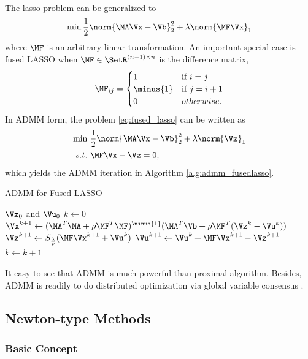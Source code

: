 \documentclass[
10pt, %
a4paper, %
oneside, %
headinclude,footinclude, %
BCOR5mm, %
]{scrartcl}
\begin{document}
\paragraph{}
The lasso problem can be generalized to
\begin{equation} \label{eq:fused_lasso}
	\min \frac{1}{2}\norm{\MA \Vx - \Vb}_2^2 + \lambda \norm{\MF \Vx}_1
\end{equation}
where $\MF$ is an arbitrary linear transformation. An important special case is 
fused LASSO when $\MF \in \SetR^{(n-1) \times n}$ is the difference matrix,
\begin{equation*}
\MF_{ij} =  
	\begin{cases} 1 &\mbox{if }  i = j \\
	\minus{1} & \mbox{if } j = i+1 \\
	0 & otherwise.\end{cases} 
\end{equation*}
In ADMM form, the problem \eqref{eq:fused_lasso} can be written as
\begin{align}
	\min~& \frac{1}{2}\norm{\MA \Vx - \Vb}_2^2 + \lambda \norm{\Vz}_1
	\nonumber \\
	s.t.~& \MF\Vx - \Vz = 0, \nonumber
\end{align}
which yields the ADMM iteration in Algorithm \ref{alg:admm_fusedlasso}.
\begin{algorithm}[ht]
\caption{ADMM for Fused LASSO}\label{alg:admm_fusedlasso}
\begin{algorithmic}[1]
\Require $ \Vz_0$ and $\Vu_0$
\State $ k \gets 0 $
\Repeat
\State $\Vx^{k+1} \gets (\MA^T\MA + \rho \MF^T \MF)^{\minus{1}} (\MA^T\Vb + 
\rho \MF^T(\Vz^k - \Vu^k)) $
\State $\Vz^{k+1} \gets S_{\frac{\lambda}{\rho}}(\MF\Vx^{k+1} + \Vu^k) $
\State $\Vu^{k+1} \gets \Vu^k + \MF \Vx^{k+1} - \Vz^{k+1}$
\State $k \gets k+1$
\end{algorithmic}
\end{algorithm}


It easy to see that ADMM is much powerful than proximal algorithm. Besides, 
ADMM is readily to do distributed optimization via global variable consensus 
\cite{boyd2011distributed}.


\subsection{Newton-type Methods}
\subsubsection{Basic Concept}
\end{document}
